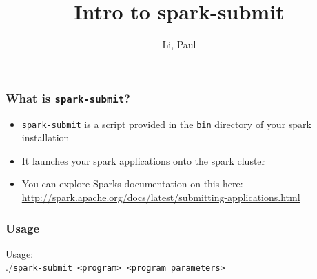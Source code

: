 \documentclass{beamer}
\title{Intro to spark-submit}
\author{Li, Paul}
\begin{document}
\frame{\titlepage}
\begin{frame}
  \frametitle{What is \texttt{spark-submit}?}
  \begin{itemize}
    \item \texttt{spark-submit} is a script provided in the \texttt{bin} directory of
      your spark installation
    \item It launches your spark applications onto the spark cluster
    \item You can explore Sparks documentation on this here:
      \url{http://spark.apache.org/docs/latest/submitting-applications.html}
  \end{itemize}
\end{frame}

\begin{frame}
  \frametitle{ Usage}
  Usage: \\
  ./\texttt{spark-submit <program> <program parameters>} \\
\end{frame}
\end{document}
